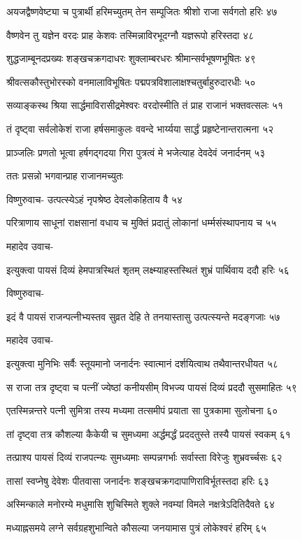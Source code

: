 अयजद्वैष्णवेष्ट्या च पुत्रार्थी हरिमच्युतम्
तेन सम्पूजितः श्रीशो राजा सर्वगतो हरिः ४७

वैष्णवेन तु यज्ञेन वरदः प्राह केशवः
तस्मिन्नाविरभूदग्नौ यज्ञरूपो हरिस्तदा ४८

शुद्धजाम्बूनदप्रख्यः शङ्खचक्रगदाधरः
शुक्लाम्बरधरः श्रीमान्सर्वभूषणभूषितः ४९

श्रीवत्सकौस्तुभोरस्को वनमालाविभूषितः
पद्मपत्रविशालाक्षश्चतुर्बाहुरुदारधीः ५०

सव्याङ्कस्थ श्रिया सार्द्धमाविरासीद्रमेश्वरः
वरदोस्मीति तं प्राह राजानं भक्तवत्सलः ५१

तं दृष्ट्वा सर्वलोकेशं राजा हर्षसमाकुलः
ववन्दे भार्य्यया सार्द्धं प्रहृष्टेनान्तरात्मना ५२

प्राञ्जलिः प्रणतो भूत्वा हर्षगद्गदया गिरा
पुत्रत्वं मे भजेत्याह देवदेवं जनार्दनम् ५३

ततः प्रसन्नो भगवान्प्राह राजानमच्युतः

विष्णुरुवाच-
उत्पत्स्येऽहं नृपश्रेष्ठ देवलोकहिताय वै ५४

परित्राणाय साधूनां राक्षसानां वधाय च
मुक्तिं प्रदातुं लोकानां धर्म्मसंस्थापनाय च ५५

महादेव उवाच-

इत्युक्त्वा पायसं दिव्यं हेमपात्रस्थितं शृतम्
लक्ष्म्याहस्तस्थितं शुभ्रं पार्थिवाय ददौ हरिः ५६

विष्णुरुवाच-

इदं वै पायसं राजन्पत्नीभ्यस्तव सुव्रत
देहि ते तनयास्तासु उत्पत्स्यन्ते मदङ्गजाः ५७

महादेव उवाच-

इत्युक्त्वा मुनिभिः सर्वैः स्तूयमानो जनार्दनः
स्वात्मानं दर्शयित्वाथ तथैवान्तरधीयत ५८

स राजा तत्र दृष्ट्वा च पत्नीं ज्येष्ठां कनीयसीम्
विभज्य पायसं दिव्यं प्रददौ सुसमाहितः ५९

एतस्मिन्नन्तरे पत्नी सुमित्रा तस्य मध्यमा
तत्समीपं प्रयाता सा पुत्रकामा सुलोचना ६०

तां दृष्ट्वा तत्र कौशल्या कैकेयी च सुमध्यमा
अर्द्धमर्द्धं प्रददतुस्ते तस्यै पायसं स्वकम् ६१

तत्प्राश्य पायसं दिव्यं राजपत्न्यः सुमध्यमाः
सम्पन्नगर्भाः सर्वास्ता विरेजुः शुभ्रवर्च्चसः ६२

तासां स्वप्नेषु देवेशः पीतवासा जनार्दनः
शङ्खचक्रगदापाणिराविर्भूतस्तदा हरिः ६३

अस्मिन्काले मनोरम्ये मधुमासि शुचिस्मिते
शुक्ले नवम्यां विमले नक्षत्रेऽदितिदैवते ६४

मध्याह्नसमये लग्ने सर्वग्रहशुभान्विते
कौसल्या जनयामास पुत्रं लोकेश्वरं हरिम् ६५

